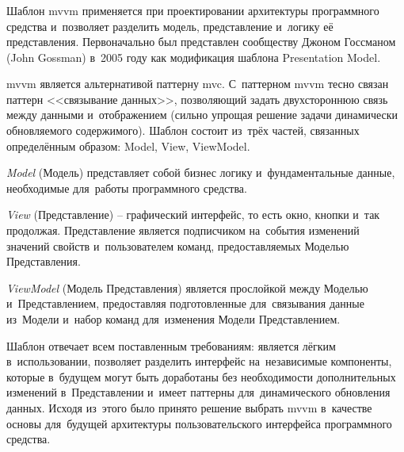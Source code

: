 \subsubsection {}
\label{sec:analysis:research:mobArch:mvvm}

Шаблон \gls{mvvm} применяется при проектировании архитектуры программного средства и~позволяет разделить модель, представление и~логику её представления. Первоначально был представлен сообществу Джоном Госсманом (John Gossman) в~2005 году как модификация шаблона Presentation Model\cite{wiki:mvvm}.

\gls{mvvm} является альтернативой паттерну \gls{mvc}. С~паттерном \gls{mvvm} тесно связан паттерн <<связывание данных>>, позволяющий задать двухстороннюю связь между данными и~отображением (сильно упрощая решение задачи динамически обновляемого содержимого). Шаблон состоит из~трёх частей, связанных определённым образом: Model, View, ViewModel.

\emph{Model} (Модель) представляет собой бизнес логику и~фундаментальные данные, необходимые для~работы программного средства.

\emph{View} (Представление) -- графический интерфейс, то есть окно, кнопки и~так продолжая. Представление является подписчиком на~события изменений значений свойств и~пользователем команд, предоставляемых Моделью Представления.

\emph{ViewModel} (Модель Представления) является прослойкой между Моделью и~Представлением, предоставляя подготовленные для~связывания данные из~Модели и~набор команд для~изменения Модели Представлением.

Шаблон отвечает всем поставленным требованиям: является лёгким в~использовании, позволяет разделить интерфейс на~независимые компоненты, которые в~будущем могут быть доработаны без необходимости дополнительных изменений в~Представлении и~имеет паттерны для~динамического обновления данных\cite{app-architecture}. Исходя из~этого было принято решение выбрать \gls{mvvm} в~качестве основы для~будущей архитектуры пользовательского интерфейса программного средства.